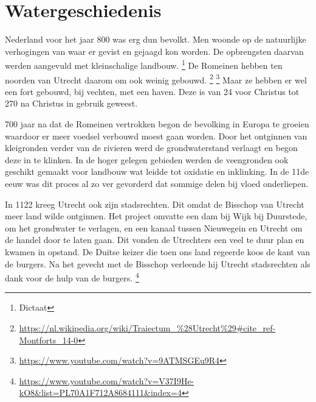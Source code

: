 \section{Watergeschiedenis}

Nederland voor het jaar 800 was erg dun bevolkt.
Men woonde op de natuurlijke verhogingen van waar er gevist en gejaagd kon worden.
De opbrengsten daarvan werden aangevuld met kleinschalige landbouw.
\footnote{Dictaat}
De Romeinen hebben ten noorden van Utrecht daarom om ook weinig gebouwd.
\footnote{\url{https://nl.wikipedia.org/wiki/Traiectum_%28Utrecht%29#cite_ref-Montforts_14-0}}
\footnote{\url{https://www.youtube.com/watch?v=9ATMSGEu9R4}}
Maar ze hebben er wel een fort gebouwd, bij vechten, met een haven.
Deze is van 24 voor Christus tot 270 na Christus in gebruik geweest.

700 jaar na dat de Romeinen vertrokken begon de bevolking in Europa te groeien waardoor er meer voedsel verbouwd moest gaan worden.
Door het ontginnen van kleigronden verder van de rivieren werd de grondwaterstand verlaagt en begon deze in te klinken.
In de hoger gelegen gebieden werden de veengronden ook geschikt gemaakt voor landbouw wat leidde tot oxidatie en inklinking.
In de 11de eeuw was dit proces al zo ver gevorderd dat sommige delen bij vloed onderliepen.

In 1122 kreeg Utrecht ook zijn stadsrechten.
Dit omdat de Bisschop van Utrecht meer land wilde ontginnen.
Het project omvatte een dam bij Wijk bij Duurstede, om het grondwater te verlagen,
en een kanaal tussen Nieuwegein en Utrecht om de handel door te laten gaan.
Dit vonden de Utrechters een veel te duur plan en kwamen in opstand.
De Duitse keizer die toen ons land regeerde koos de kant van de burgers.
Na het gevecht met de Bisschop verleende hij Utrecht stadsrechten als dank voor de hulp van de burgers.
\footnote{\url{https://www.youtube.com/watch?v=V37I9He-kO8&list=PL70A1F712A8684111&index=4}}

